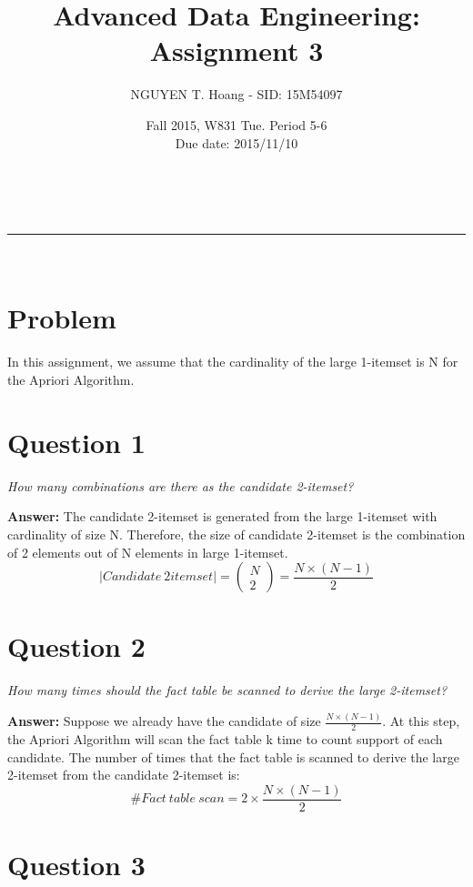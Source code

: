 \documentclass[a4paper,11pt]{article}
\makeatletter
\newcommand{\linia}{\rule{\linewidth}{0.5pt}}
\renewcommand{\maketitle}{
\begin{center}
\vspace{2ex}
{\huge \textsc{\@title}}
\vspace{1ex}
\\
\linia\\
\@author \hfill \@date
\vspace{4ex}
\end{center}
}
\makeatother
\begin{document}
\title{Advanced Data Engineering: Assignment 3}

\author{NGUYEN T. Hoang - SID: 15M54097}

\date{Fall 2015, W831 Tue. Period 5-6 \\ \hfill Due date: 2015/11/10}

\maketitle

\section*{Problem}
In this assignment, we assume that the cardinality  of the large 1-itemset is N for the Apriori Algorithm.

\section*{Question 1}

\textit{How many combinations are there as the candidate 2-itemset?}

\noindent
\textbf{Answer:} The candidate 2-itemset is generated from the large 1-itemset with cardinality of size N. Therefore, the size of candidate 2-itemset is the combination of 2 elements out of N elements in large 1-itemset.
$$\left | Candidate\ 2itemset \right | = \begin{pmatrix} N\\2 \end{pmatrix} = \frac{N\times (N-1)}{2}$$
\section*{Question 2}
\textit{How many times should the fact table be scanned to derive the large 2-itemset?}

\noindent
\textbf{Answer:} Suppose we already have the candidate of size $\frac{N\times (N-1)}{2}$. At this step, the Apriori Algorithm will scan the fact table k time to count support of each candidate. The number of times that the fact table is scanned to derive the large 2-itemset from the candidate 2-itemset is:
$$\#Fact\ table\ scan = 2\times \frac{N\times (N-1)}{2}$$

\section*{Question 3}
\end{document}
